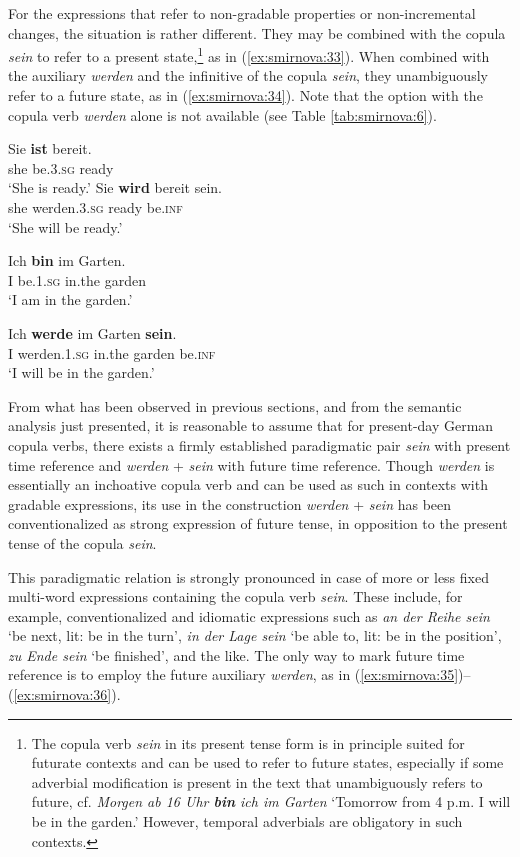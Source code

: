 \documentclass[output=paper,colorlinks,citecolor=brown]{langscibook}
\begin{document}
For the expressions that refer to non-gradable properties or non-incremental changes, the situation is rather different. They may be combined with the copula \textit{sein} to refer to a present state,\footnote{The copula verb \emph{sein} in its present tense form is in principle suited for futurate contexts and can be used to refer to future states, especially if some adverbial modification is present in the text that unambiguously refers to future, cf. \emph{Morgen ab 16 Uhr \textbf{bin} ich {im Garten}} `Tomorrow from 4 p.m. I will be in the garden.' However, temporal adverbials are obligatory in such contexts.} as in (\ref{ex:smirnova:33}). When combined with the auxiliary \textit{werden} and the infinitive of the copula \textit{sein}, they unambiguously refer to a future state, as in (\ref{ex:smirnova:34}). Note that the option with the copula verb \textit{werden} alone is not available (see Table \ref{tab:smirnova:6}). 

\ea\label{ex:smirnova:33}
\ea\label{ex:smirnova:33a}
\gll Sie \textbf{ist} bereit.\\
    she be.\textsc{3.sg} ready \\
\glt `She is ready.'
\ex\label{ex:smirnova:33b}
\gll Sie \textbf{wird} bereit sein.\\
    she werden.\textsc{3.sg} ready be.\textsc{inf}\\
\glt `She will be ready.'
\z
\z

\ea\label{ex:smirnova:34}
\ea\label{ex:smirnova:34a}
\gll Ich \textbf{bin} im Garten.\\
    I be.\textsc{1.sg} in.the garden \\
\glt `I am in the garden.'

\ex\label{ex:smirnova:34b}
\gll Ich \textbf{werde} im Garten \textbf{sein}. \\
I werden.\textsc{1.sg} in.the garden be.\textsc{inf}\\
\glt `I will be in the garden.'
    \z
\z

From what has been observed in previous sections, and from the semantic analysis just presented, it is reasonable to assume that for present-day German copula verbs, there exists a firmly established paradigmatic pair \textit{sein} with present time reference and \textit{werden} + \textit{sein} with future time reference. Though \emph{werden} is essentially an inchoative copula verb and can be used as such in contexts with gradable expressions, its use in the construction \textit{werden} + \textit{sein} has been conventionalized as strong expression of future tense, in opposition to the present tense of the copula \emph{sein}.
\par This paradigmatic relation is strongly pronounced in case of more or less fixed multi-word expressions containing the copula verb \textit{sein}. These include, for example, conventionalized and idiomatic expressions such as \textit{an der Reihe sein} `be next, lit: be in the turn', \textit{in der Lage sein} `be able to, lit: be in the position', \textit{zu Ende sein} `be finished', and the like. The only way to mark future time reference is to employ the future auxiliary \textit{werden}, as in (\ref{ex:smirnova:35})--(\ref{ex:smirnova:36}).
\end{document}
